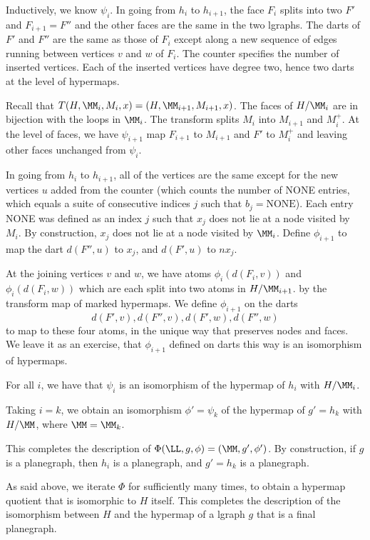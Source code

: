 Inductively, we know $\psi_i$.  In going from $h_i$ to $h_{i+1}$, the
face $F_i$ splits into two $F'$ and $F_{i+1}=F''$ and the other faces
are the same in the two lgraphs.  The darts of $F'$ and $F''$ are the
same as those of $F_i$ except along a new sequence of edges running
between vertices $v$ and $w$ of $F_i$.  The counter specifies the
number of inserted vertices.  Each of the inserted vertices have
degree two, hence two darts at the level of hypermaps.

Recall that  $T(H,\MM_i,M_i,x) = (H,\MM_{i+1},M_{i+1},x)$.  The
faces of $H/\MM_i$ are in bijection with the loops in $\MM_i$. 
The transform splits $M_i$ into $M_{i+1}$ and $M_i^+$.  At the level
of faces, we have $\psi_{i+1}$ map $F_{i+1}$ to $M_{i+1}$ and $F'$
to $M_i^+$ and leaving other faces unchanged from $\psi_i$.

In going from $h_i$ to $h_{i+1}$, all of the vertices are the same
except for the new vertices $u$ added from the counter (which counts
the number of NONE entries, which equals a suite of consecutive
indices $j$ such that $b_j = \text{NONE}$).  Each entry NONE was
defined as an index $j$ such that $x_j$ does not lie at a node visited
by $M_i$.  By construction, $x_j$ does not
lie at a node visited by $\MM_i$.  Define $\phi_{i+1}$ to map the dart
$d(F'',u)$ to $x_j$, and $d(F',u)$ to $n x_j$.

At the joining vertices $v$ and $w$, we have atoms $\phi_i(d(F_i,v))$
and $\phi_i(d(F_i,w))$ which are each split into two atoms in
$H/\MM_{i+1}$.  by the transform map of marked hypermaps.  We define
$\phi_{i+1}$ on the darts
\[
d(F',v), d(F'',v), d(F',w), d(F'',w)
\]
to map to these four atoms, in the unique way that preserves nodes and
faces.  We leave it as an exercise, that $\phi_{i+1}$ defined on darts
this way is an isomorphism of hypermaps.

\begin{lemma} For all $i$, we have that 
$\psi_{i}$ is an isomorphism of the hypermap
of $h_{i}$  with $H/\MM_i$.
\end{lemma} 

Taking $i=k$, we obtain an isomorphism $\phi'=\psi_k$ of
the hypermap of $g'=h_k$ with $H/\MM$, where $\MM=\MM_k$.

This completes the description of $\Phi(\LL,g,\phi) = (\MM,g',\phi')$.
By construction, if $g$ is a planegraph, then $h_i$ is a planegraph,
and $g' = h_k$ is a planegraph.

As said above, we iterate $\Phi$ for sufficiently many times, to obtain a
hypermap quotient that is isomorphic to $H$ itself.
This completes the description of the isomorphism between
$H$ and the hypermap of a  lgraph $g$ that is a final planegraph.

